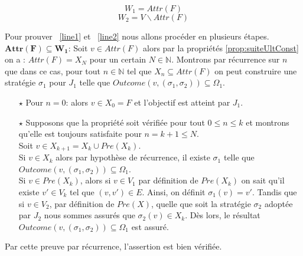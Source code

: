 	\begin{propriete}
		\label{prop:attracteur}
	\begin{equation}
		W_{1} = Attr(F) \label{line1}
	\end{equation}
	\begin{equation}
		W_{2} = V \backslash Attr(F) \label{line2}
	\end{equation}
		
	\end{propriete}
	\begin{demonstration}
		Pour prouver ~\eqref{line1} et ~\eqref{line2} nous allons procéder en plusieurs étapes.\\
		
		\noindent$\mathbf{Attr(F) \subseteq W_{1}}$: Soit $v \in Attr(F)$ alors par la propriétés \ref{prop:suiteUltConst} on a : $Attr(F) = X_{N}$ pour un certain $N \in \mathbb{N}$. Montrons par récurrence sur $n$ que dans ce cas, pour tout $n \in \mathbb{N}$ tel que $X_{n} \subseteq Attr(F)$ on peut construire une stratégie $\sigma _{1}$ pour $J_{1}$ telle que $Outcome(v,(\sigma _{1},\sigma _{2})) \subseteq \Omega _{1}$.
		\begin{enumerate}
			\item[$\star$] Pour $n=0$: alors $v \in X_{0} = F$ et l'objectif est atteint par $J_{1}$.
			\item[$\star$] Supposons que la propriété soit vérifiée pour tout $ 0 \leq n \leq k $ et montrons qu'elle est toujours satisfaite pour $n = k + 1 \leq N$. \\
			Soit $v \in X_{k+1} = X_{k} \cup Pre(X_{k})$. \\
			Si $v \in X_{k}$ alors par hypothèse de récurrence, il existe $\sigma _{1}$ telle que $Outcome(v,(\sigma _{1},\sigma _{2})) \subseteq \Omega _{1}$.\\
			Si $v \in Pre(X_{k})$, alors si $v \in V_{1}$ par définition de $Pre(X_{k})$ on sait qu'il existe $v'\in V_{k}$ tel que $(v,v')\in E$. Ainsi, on définit $\sigma _{1}(v) = v'$. Tandis que si $v \in V_{2}$, par définition de $Pre(X)$, quelle que soit la stratégie $\sigma _{2}$ adoptée par $J_{2}$  nous sommes assurés que $\sigma _{2}(v) \in X_{k}$. Dès lors, le résultat $Outcome(v,(\sigma _{1},\sigma _{2})) \subseteq \Omega _{1}$ est assuré.
		\end{enumerate}
		Par cette preuve par récurrence, l'assertion est bien vérifiée.\\
		

\end{demonstration}
